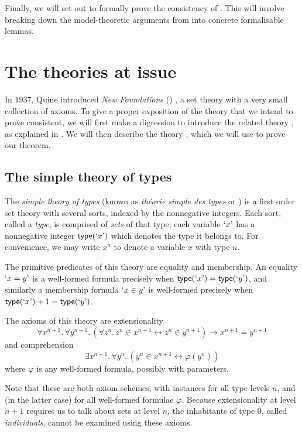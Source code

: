 Finally, we will set out to formally prove the consistency of \NF.
This will involve breaking down the model-theoretic arguments from \cite{typical-ambiguity,holmes-ttt} into concrete formalisable lemmas.

\section{The theories at issue}
\label{s:theories}

In 1937, Quine introduced \emph{New Foundations} (\NF) \cite{quine-nf}, a set theory with a very small collection of axioms.
To give a proper exposition of the theory that we intend to prove consistent, we will first make a digression to introduce the related theory {\TST}, as explained in \cite{con-nf}.
We will then describe the theory {\TTT}, which we will use to prove our theorem.

\subsection{The simple theory of types}

The \emph{simple theory of types} (known as \emph{théorie simple des types} or {\TST}) is a first order set theory with several sorts, indexed by the nonnegative integers.
Each sort, called a \emph{type}, is comprised of \emph{sets} of that type; each variable \( \mquote{x} \) has a nonnegative integer \( \ttype(\mquote x) \) which denotes the type it belongs to.
For convenience, we may write \( x^n \) to denote a variable \( x \) with type \( n \).

The primitive predicates of this theory are equality and membership.
An equality \( \mquote{x = y} \) is a well-formed formula precisely when \( \ttype(\mquote{x}) = \ttype(\mquote{y}) \), and similarly a membership formula \( \mquote{x \in y} \) is well-formed precisely when \( \ttype(\mquote{x}) + 1 = \ttype(\mquote{y}) \).

The axioms of this theory are extensionality
\[ \forall x^{n + 1}.\, \forall y^{n + 1}.\, (\forall z^n.\, z^n \in x^{n+1} \leftrightarrow z^n \in y^{n+1}) \to x^{n+1} = y^{n+1} \]
and comprehension
\[ \exists x^{n + 1}.\, \forall y^n.\, (y^n \in x^{n+1} \leftrightarrow \varphi(y^n)) \]
where \( \varphi \) is any well-formed formula, possibly with parameters.

Note that these are both axiom schemes, with instances for all type levels \( n \), and (in the latter case) for all well-formed formulae \( \varphi \).
Because extensionality at level \( n + 1 \) requires us to talk about sets at level \( n \), the inhabitants of type 0, called \emph{individuals}, cannot be examined using these axioms.

